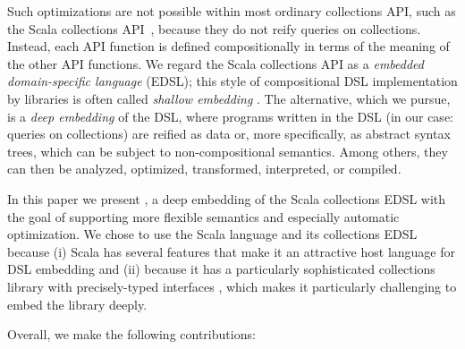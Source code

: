 Such optimizations are not possible within most ordinary collections API, such as the Scala collections API~\cite{odersky2009fighting}, because they
do not reify queries on collections. Instead, each API function is defined compositionally in terms
of the meaning of the other API functions.
We regard the Scala collections API as a \emph{embedded domain-specific language} (EDSL); this style of compositional DSL implementation by libraries is often
called \emph{shallow embedding}%
. The alternative, which we pursue, is a \emph{deep embedding} of the DSL, where programs written in the DSL (in our case: 
queries on collections) are reified as data or, more specifically, as abstract syntax trees, which can be subject to non-compositional semantics. Among others, they can then be analyzed, optimized, transformed, interpreted, or compiled.

In this paper we present \LoS, a deep embedding of the Scala collections EDSL with the goal of supporting more flexible semantics and especially automatic optimization.
We chose to use the Scala language and its collections EDSL because (i) Scala has several features that make it an attractive host language for DSL embedding \citep{Odersky11book} and (ii) because it has a particularly sophisticated collections library with precisely-typed interfaces \citep{odersky2009fighting}, which makes it particularly challenging to embed the library deeply.




Overall, we make the following contributions:


